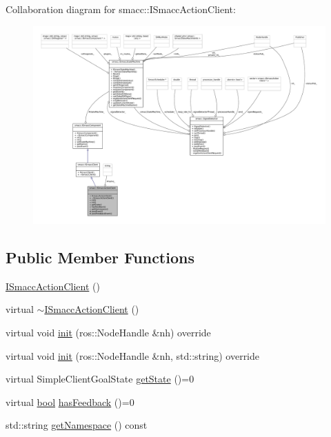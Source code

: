 Collaboration diagram for smacc\+:\+:I\+Smacc\+Action\+Client\+:
\nopagebreak
\begin{figure}[H]
\begin{center}
\leavevmode
\includegraphics[width=350pt]{classsmacc_1_1ISmaccActionClient__coll__graph}
\end{center}
\end{figure}
\subsection*{Public Member Functions}
\begin{DoxyCompactItemize}
\item 
\hyperlink{classsmacc_1_1ISmaccActionClient_a42e3f1a869fd7ec6805437989ba58abc}{I\+Smacc\+Action\+Client} ()
\item 
virtual \hyperlink{classsmacc_1_1ISmaccActionClient_addfb7671a467fc52cb8ee49e23d48fec}{$\sim$\+I\+Smacc\+Action\+Client} ()
\item 
virtual void \hyperlink{classsmacc_1_1ISmaccActionClient_ada515034533cfc7be40407aee31fd76f}{init} (ros\+::\+Node\+Handle \&nh) override
\item 
virtual void \hyperlink{classsmacc_1_1ISmaccActionClient_ad51cf3b82a54fb6d698e9da9cb42ad38}{init} (ros\+::\+Node\+Handle \&nh, std\+::string) override
\item 
virtual Simple\+Client\+Goal\+State \hyperlink{classsmacc_1_1ISmaccActionClient_a272349b93828674d57fb48070f4edebf}{get\+State} ()=0
\item 
virtual \hyperlink{classbool}{bool} \hyperlink{classsmacc_1_1ISmaccActionClient_aeb19cbd28597071617f8324954fa7c40}{has\+Feedback} ()=0
\item 
std\+::string \hyperlink{classsmacc_1_1ISmaccActionClient_ac9355b793956473a52879a9638601f02}{get\+Namespace} () const 
\end{DoxyCompactItemize}
